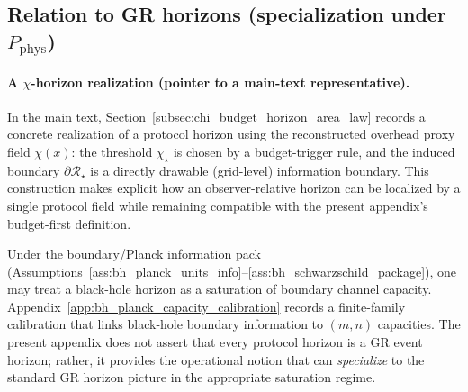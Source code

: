 \subsection{Relation to GR horizons (specialization under \texorpdfstring{$P_{\mathrm{phys}}$}{Pphys})}
\label{subsec:protocol_horizon_gr_specialization}

\paragraph{A $\chi$-horizon realization (pointer to a main-text representative).}
\InterfaceTag In the main text, Section~\ref{subsec:chi_budget_horizon_area_law} records a concrete realization of a protocol horizon using the reconstructed overhead proxy field $\chi(x)$:
the threshold $\chi_\star$ is chosen by a budget-trigger rule, and the induced boundary $\partial\mathcal R_\star$ is a directly drawable (grid-level) information boundary.
This construction makes explicit how an observer-relative horizon can be localized by a single protocol field while remaining compatible with the present appendix's budget-first definition.

\AuditTag Under the boundary/Planck information pack (Assumptions~\ref{ass:bh_planck_units_info}--\ref{ass:bh_schwarzschild_package}),
one may treat a black-hole horizon as a saturation of boundary channel capacity.
Appendix~\ref{app:bh_planck_capacity_calibration} records a finite-family calibration that links black-hole boundary information to $(m,n)$ capacities.
The present appendix does not assert that every protocol horizon is a GR event horizon; rather, it provides the operational notion that can \emph{specialize} to the standard GR horizon picture in the appropriate saturation regime.


